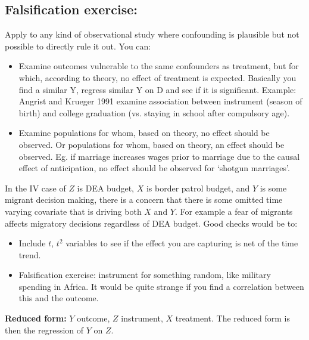 \documentclass[12 pt, leqno]{article}
\begin{document}
\subsection{Falsification exercise:}

Apply to any kind of observational study where confounding is plausible but not possible to directly rule it out. You can:

\begin{itemize}
\item Examine outcomes vulnerable to the same confounders as treatment, but for which, according to theory, no effect of treatment is expected. Basically you find a similar Y, regress similar Y on D and see if it is significant. Example: Angrist and Krueger 1991 examine association between instrument (season of birth) and college graduation (vs. staying in school after compulsory age).
\item Examine populations for whom, based on theory, no effect should be observed. Or populations for whom, based on theory, an effect should be observed. Eg. if marriage increases wages prior to marriage due to the causal effect of anticipation, no effect should be observed for `shotgun marriages'. 
\end{itemize}

In the IV case of $Z$ is DEA budget, $X$ is border patrol budget, and $Y$ is some migrant decision making, there is a concern that there is some omitted time varying covariate that is driving both $X$ and $Y$. For example a fear of migrants affects migratory decisions regardless of DEA budget. Good checks would be to:
\begin{itemize}
\item Include $t$, $t^2$ variables to see if the effect you are capturing is net of the time trend.
\item Falsification exercise: instrument for something random, like military spending in Africa. It would be quite strange if you find a correlation between this and the outcome.
\end{itemize}
 

\textbf{Reduced form:} $Y$ outcome, $Z$ instrument, $X$ treatment. The reduced form is then the regression of $Y$ on $Z$. 
\end{document}
